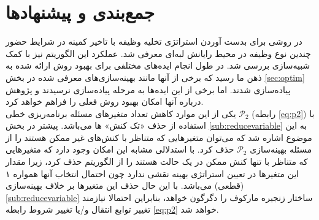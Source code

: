 \chapter{جمع‌بندی و پیشنهاد‌ها}
در \CurrentProject روشی برای بدست آوردن استراتژی تخلیه وظیفه با تاخیر کمینه در شرایط حضور چندین نوع وظیفه در محیط رایانش لبه‌ای معرفی شد. عملکرد این الگوریتم نیز با کمک شبیه‌سازی بررسی شد. در طول انجام \CurrentProject ایده‌های مختلفی برای بهبود روش ارائه شده به ذهن ما رسید که برخی از آنها مانند بهینه‌سازی‌های معرفی شده در بخش \ref{sec:optim} پیاده‌سازی شدند. اما برخی از این ایده‌ها به مرحله پیاده‌سازی نرسیدند و پژوهش درباره آنها امکان بهبود روش فعلی را فراهم خواهد کرد. \\

یکی از این موارد کاهش تعداد متغیرهای مسئله برنامه‌ریزی خطی
$\mathcal{P}_2$
(رابطه \ref{eq:p2})
 با استفاده از حذف «تک کنش» ها می‌باشد. پیشتر در بخش \ref{sub:reducevariable} به این موضوع اشاره شد که می‌توان متغیرهایی که متناظر با کنش‌های غیر ممکن هستند را از مسئله بهینه‌سازی 
 $\mathcal{P}_2$
 حذف کرد. با استدلالی مشابه این امکان وجود دارد که متغیرهایی که متناظر با تنها کنش ممکن در یک حالت هستند را از الگوریتم حذف کرد، زیرا مقدار این متغیرها در تعیین استراتژی بهینه نقشی ندارد چون احتمال انتخاب آنها همواره ۱ (قطعی) می‌باشد. با این حال حذف این متغیرها بر خلاف بهینه‌سازی \ref{sub:reducevariable} ساختار زنجیره مارکوف را دگرگون خواهد، بنابراین احتمالا نیازمند تغییر توابع انتقال و/یا تغییر شروط رابطه \ref{eq:p2} خواهد شد.
\clearpage
